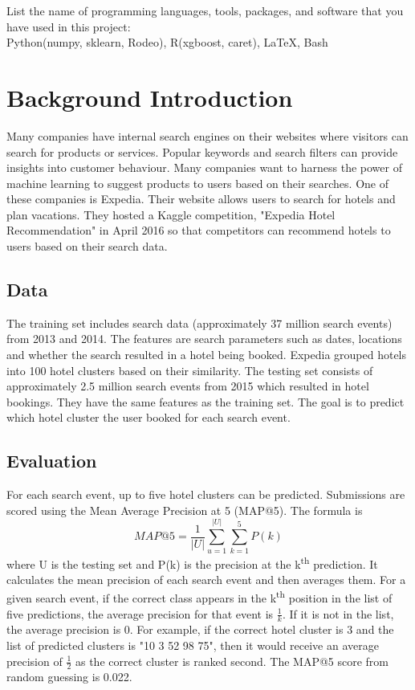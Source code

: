 \documentclass[12pt]{report}
\begin{document}
List the name of programming languages, tools, packages, and software that you have used in this project:\\
Python(numpy, sklearn, Rodeo), R(xgboost, caret), \LaTeX, Bash



\setlength{\parindent}{0cm}

\chapter{Background Introduction}
Many companies have internal search engines on their websites where visitors can search for products or services. Popular keywords and search filters can provide insights into customer behaviour. Many companies want to harness the power of machine learning to suggest products to users based on their searches. One of these companies is Expedia. Their website allows users to search for hotels and plan vacations. They hosted a Kaggle competition, "Expedia Hotel Recommendation" in April 2016 so that competitors can recommend hotels to users based on their search data.
\section{Data}
The training set includes search data (approximately 37 million search events) from 2013 and 2014. The features are search parameters such as dates, locations and whether the search resulted in a hotel being booked. Expedia grouped hotels into 100 hotel clusters based on their similarity. The testing set consists of approximately 2.5 million search events from 2015 which resulted in hotel bookings. They have the same features as the training set. The goal is to predict which hotel cluster the user booked for each search event.
\section{Evaluation}
For each search event, up to five hotel clusters can be predicted. Submissions are scored using the Mean Average Precision at 5 (MAP@5). The formula is
\[MAP@5=\frac{1}{|U|}\sum_{u=1}^{|U|}\sum_{k=1}^{5}P(k)\]
where U is the testing set and P(k) is the precision at the k\textsuperscript{th} prediction. It calculates the mean precision of each search event and then averages them. For a given search event, if the correct class appears in the k\textsuperscript{th} position in the list of five predictions, the average precision for that event is $\frac{1}{k}$. If it is not in the list, the average precision is 0. For example, if the correct hotel cluster is 3 and the list of predicted clusters is "10 3 52 98 75", then it would receive an average precision of $\frac{1}{2}$ as the correct cluster is ranked second. The MAP@5 score from random guessing is 0.022.
\end{document}
